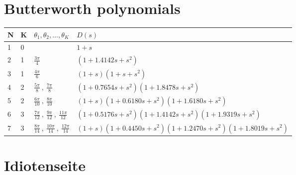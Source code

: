 \section{Butterworth polynomials}\label{app:Butterworth}

\begin{tabular}{|l|l|l|l|}
	\hline
	N & K & $\theta_1,\theta_2,\ldots,\theta_K$ & $D(s)$ \\ \hline
	1 & 0 & & $1+s$ \\ \hline
	2 & 1 & $\frac{3\pi}{4}$ & $(1 + 1.4142s + s^2)$ \\ \hline
	3 & 1 & $\frac{4\pi}{6}$ & $(1+s)(1+s+s^2)$ \\ \hline
	4 & 2 & $\frac{5\pi}{8}\:,\:\frac{7\pi}{8}$ & $(1+0.7654s+s^2)(1+1.8478s+s^2)$ \\ \hline
	5 & 2 & $\frac{6\pi}{10}\:,\:\frac{8\pi}{10}$ & $(1+s)(1+0.6180s+s^2)(1+1.6180s+s^2)$ \\ \hline
	6 & 3 & $\frac{7\pi}{12}\:,\:\frac{9\pi}{12}\:,\:\frac{11\pi}{12}$ & $(1+0.5176s+s^2)(1+1.4142s+s^2)(1+1.9319s+s^2)$ \\ \hline
	7 & 3 & $\frac{8\pi}{14}\:,\:\frac{10\pi}{14}\:,\:\frac{12\pi}{14}$ & $(1+s)(1+0.4450s+s^2)(1+1.2470s+s^2)(1+1.8019s+s^2)$ \\ \hline
\end{tabular}

\newpage
\section{Idiotenseite}\label{app:Idiotenseite}



\begin{multicols}{2}






\end{multicols}



